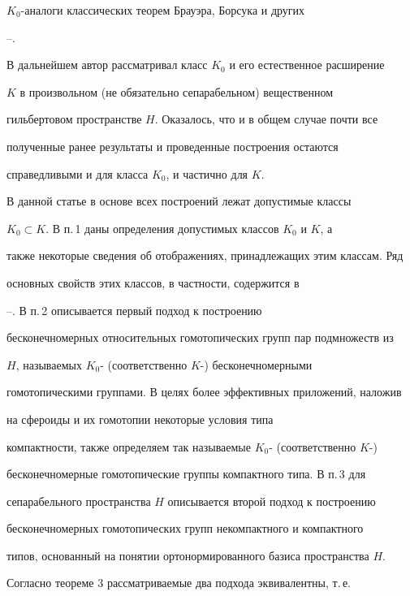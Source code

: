 $K_0$-аналоги классических теорем Брауэра, Борсука и других 


\cite{7}--\cite{10}. 


 


В дальнейшем автор рассматривал класс $K_0$ и его естественное расширение 


$K$ в произвольном (не обязательно сепарабельном) вещественном 


гильбертовом пространстве $H$. Оказалось, что и в общем случае почти все 


полученные ранее результаты и проведенные построения остаются 


справедливыми и для класса $K_0$, и частично для $K$. 


 


В данной статье в основе всех построений лежат допустимые классы 


$K_0\subset K$. В п.\,1 даны определения допустимых классов $K_0$ и $K$, а 


также некоторые сведения об отображениях, принадлежащих этим классам. Ряд 


основных свойств этих классов, в частности, содержится в 


\cite{1}--\cite{6}. В п.\,2 описывается первый подход к построению 


бесконечномерных относительных гомотопических групп пар подмножеств из 


$H$, называемых $K_0$- (соответственно $K$-) бесконечномерными 


гомотопическими группами. В целях более эффективных приложений, наложив 


на сфероиды и их гомотопии некоторые условия типа 


компактности, также определяем так называемые $K_0$- (соответственно $K$-) 


бесконечномерные гомотопические группы компактного типа. В п.\,3 для


сепарабельного пространства $H$ описывается второй подход к построению 


бесконечномерных гомотопических групп некомпактного и компактного 


типов, основанный на понятии ортонормированного базиса пространства $H$. 


 


Согласно теореме 3 рассматриваемые два подхода эквивалентны, т.\,е. 



